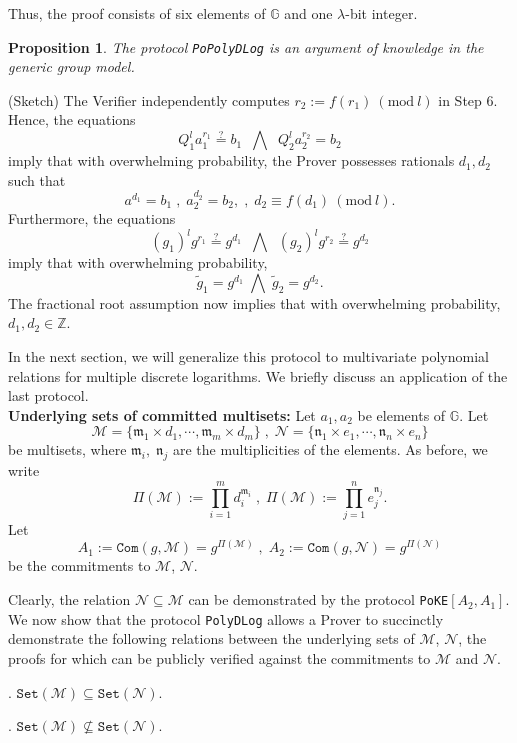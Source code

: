 \documentclass[11pt, lettersize, notitlepage, leqno, footskip=0.6cm]{article}
\newcommand{\bz}{\mathbb Z}
\newcommand{\pl}{\prod\limits}
\newcommand{\ttt}{\texttt}
\newcommand{\sett}{\ttt{Set}}
\newcommand{\wti}{\widetilde}
\newcommand{\mf}{\mathfrak}
\newcommand{\mc}{\mathcal}
\newcommand{\mb}{\mathbb}
\newcommand{\mfm}{\mathfrak{m}}
\newcommand{\mfn}{\mathfrak{n}}
\newcommand{\lam}{\lambda}
\newcommand{\sub}{\subseteq}
\newcommand{\nsub}{\nsubseteq}
\newcommand{\vs}{\vspace{-0.15cm}}
\newcommand{\noin}{\noindent}
\newcommand{\op}{overwhelming probability}
\newcommand{\Mod}[1]{\ (\mathrm{mod}\ #1)}
\newtheorem{Prop}[Thm]{Proposition}
\numberwithin{equation}{section}
\begin{document}
\noindent Thus, the proof consists of six elements of $\mb{G}$ and one $\lam$-bit integer.

\begin{Prop} The protocol \verb|PoPolyDLog| is an argument of knowledge in the generic group
model.\end{Prop}

\begin{prf} (Sketch) The Verifier independently computes $r_2:= f(r_1)\Mod{l}$ in Step 6. Hence, the equations $$Q_1^{l}a_1^{r_1}\stackrel{?}{=} b_1\;\;\bigwedge\;\; Q_2^{l}a_2^{r_2} = b_2$$ imply that with \op, the Prover possesses rationals $d_1,d_2$ such that $$a^{d_1} = b_1\;,\;a_2^{d_2} = b_2,\;,\;d_2\equiv f(d_1)\Mod{l}.$$ Furthermore, the equations \vs $$(g_1)^lg^{r_1} \stackrel{?}{=} g^{d_1}\;\;\bigwedge\;\; (g_2)^lg^{r_2} \stackrel{?}{=} g^{d_2} $$ imply that with \op, \vs $$\wti{g}_1 = g^{d_1}\;\bigwedge\;\wti{g}_2 = g^{d_2}. $$ The fractional root assumption now implies that with \op, $d_1,d_2\in \bz$.\end{prf}

\noin In the next section, we will generalize this protocol to multivariate polynomial relations for multiple discrete logarithms. We briefly discuss an application of the last protocol.\\

\noin \textbf{Underlying sets of committed multisets:} Let $a_1,a_2$ be elements of $\mb{G}$. Let \vs $$\mc{M} = \{\mf{m}_1\times d_1,\cdots, \mf{m}_m\times d_m \}\;,\;\mc{N} = \{\mf{n}_1\times e_1,\cdots, \mf{n}_n\times e_n \}$$ be multisets, where $\mf{m}_i,\;\mf{n}_j$ are the multiplicities of the elements. As before, we write \vs $$\Pi(\mc{M}):= \pl_{i=1}^m d_i^{\mfm_i}\;,\; \Pi(\mc{M}):= \pl_{j=1}^n e_j^{\mfn_j}.$$ Let \vs $$A_1:= \ttt{Com}(g, \mc{M}) =  g^{\Pi(\mc{M})}\;,\; A_2:= \ttt{Com}(g, \mc{N}) = g^{\Pi(\mc{N})}$$ be the commitments to $\mc{M}$, $\mc{N}$.

Clearly, the relation $\mc{N}\sub \mc{M}$ can be demonstrated by the protocol \verb|PoKE|$[A_2, A_1]$. We now show that the protocol \verb|PolyDLog| allows a Prover to succinctly demonstrate the following relations between the underlying sets of $\mc{M}$, $\mc{N}$, the proofs for which can be publicly verified against the commitments to $\mc{M}$ and $\mc{N}$.\vspace{0.1cm}

\noin 1. $\sett(\mc{M})\sub \sett(\mc{N})$.

\noin 2. $\sett(\mc{M})\nsub \sett(\mc{N})$.
\end{document}
